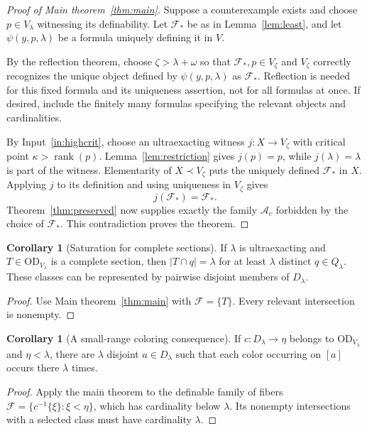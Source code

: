 \documentclass[11pt,letterpaper]{article}
\theoremstyle{definition}
\newtheorem{corollary}[definition]{Corollary}
\numberwithin{equation}{section}
\newcommand{\OD}{\mathrm{OD}}
\newcommand{\rank}{\operatorname{rank}}
\newcommand{\FF}{\mathcal F}
\newcommand{\calA}{\mathcal A}
\begin{document}
\begin{proof}[Proof of Main theorem~\ref{thm:main}]
Suppose a counterexample exists and choose $p\in V_\lambda$ witnessing its definability. Let $\FF_*$ be as in Lemma~\ref{lem:least}, and let $\psi(y,p,\lambda)$ be a formula uniquely defining it in $V$.

By the reflection theorem, choose $\zeta>\lambda+\omega$ so that $\FF_*,p\in V_\zeta$ and $V_\zeta$ correctly recognizes the unique object defined by $\psi(y,p,\lambda)$ as $\FF_*$. Reflection is needed for this fixed formula and its uniqueness assertion, not for all formulas at once. If desired, include the finitely many formulas specifying the relevant objects and cardinalities.

By Input~\ref{in:highcrit}, choose an ultraexacting witness $j:X\to V_\zeta$ with critical point $\kappa>\rank(p)$. Lemma~\ref{lem:restriction} gives $j(p)=p$, while $j(\lambda)=\lambda$ is part of the witness. Elementarity of $X\prec V_\zeta$ puts the uniquely defined $\FF_*$ in $X$. Applying $j$ to its definition and using uniqueness in $V_\zeta$ gives
\[
                         j(\FF_*)=\FF_*.
\]
Theorem~\ref{thm:preserved} now supplies exactly the family $\calA_e$ forbidden by the choice of $\FF_*$. This contradiction proves the theorem.
\end{proof}

\begin{corollary}[Saturation for complete sections]\label{cor:complete}
If $\lambda$ is ultraexacting and $T\in\OD_{V_\lambda}$ is a complete section, then $|T\cap q|=\lambda$ for at least $\lambda$ distinct $q\in Q_\lambda$. These classes can be represented by pairwise disjoint members of $D_\lambda$.
\end{corollary}

\begin{proof}
Use Main theorem~\ref{thm:main} with $\FF=\{T\}$. Every relevant intersection is nonempty.
\end{proof}

\begin{corollary}[A small-range coloring consequence]\label{cor:color}
If $c:D_\lambda\to\eta$ belongs to $\OD_{V_\lambda}$ and $\eta<\lambda$, there are $\lambda$ disjoint $a\in D_\lambda$ such that each color occurring on $[a]$ occurs there $\lambda$ times.
\end{corollary}

\begin{proof}
Apply the main theorem to the definable family of fibers $\FF=\{c^{-1}\{\xi\}:\xi<\eta\}$, which has cardinality below $\lambda$. Its nonempty intersections with a selected class must have cardinality $\lambda$.
\end{proof}
\end{document}
